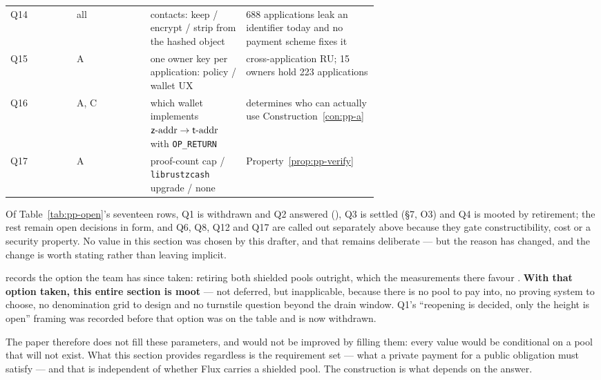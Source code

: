\begin{table}[H]
\begin{tabular}{@{}llp{0.26\linewidth}p{0.36\linewidth}@{}}
Q14 & all & contacts: keep / encrypt / strip from the hashed object & \num{688} applications leak an identifier today and no payment scheme fixes it \\
Q15 & A & one owner key per application: policy / wallet UX & cross-application RU; \num{15} owners hold \num{223} applications \\
Q16 & A, C & which wallet implements $\mathsf{z}\text{-addr}\to\mathsf{t}\text{-addr}$ with \texttt{OP\_RETURN} & determines who can actually use Construction~\ref{con:pp-a} \\
Q17 & A & proof-count cap / \texttt{librustzcash} upgrade / none & Property~\ref{prop:pp-verify} \\
\bottomrule
\end{tabular}
\end{table}

\begin{remark}
\label{rem:pp-conditional}
Of Table~\ref{tab:pp-open}'s seventeen rows, Q1 is withdrawn and Q2 answered
(), Q3 is settled (\S7, O3) and Q4 is mooted by retirement; the rest remain
open decisions in form, and Q6, Q8, Q12 and Q17 are called out separately above because they gate
constructibility, cost or a security property. No
value in this section was chosen by this drafter, and that remains deliberate --- but the reason has
changed, and the change is worth stating rather than leaving implicit.

 records the option the team has since taken: retiring both shielded
pools outright, which the measurements there favour .
\textbf{With that option taken, this entire section is moot} --- not deferred, but inapplicable,
because there is no pool to pay into, no proving system to choose, no denomination grid to design
and no turnstile question beyond the drain window. Q1's ``reopening is decided, only the height is
open'' framing was recorded before that option was on the table and is now withdrawn.

The paper therefore does not fill these parameters, and would not be improved by filling them: every
value would be conditional on a pool that will not exist. What this section provides regardless is
the requirement set --- what a
private payment for a public obligation must satisfy --- and that is independent of whether Flux
carries a shielded pool. The construction is what depends on the answer.
\end{remark}

